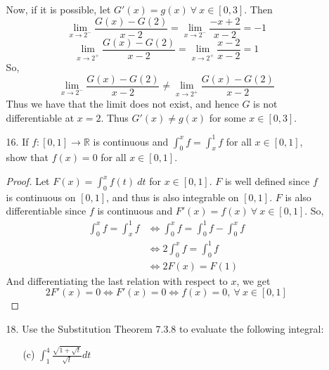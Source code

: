 \documentclass[12pt,letterpaper]{article}
\newcommand{\limx}[2]{\displaystyle\lim\limits_{#1 \to #2}}
\newcommand{\R}{\mathbb{R}}
\theoremstyle{case}
\theoremstyle{definition}
\begin{document}
\begin{enumerate}
\begin{enumerate}
			\\\\Now, if it is possible, let $G'(x)=g(x)\ \forall\ x \in [0,3]$. Then
			\[\limx{x}{2^-}\frac{G(x)-G(2)}{x-2}=\limx{x}{2^-}\frac{-x+2}{x-2} = -1\]
			\[\limx{x}{2^+}\frac{G(x)-G(2)}{x-2}=\limx{x}{2^+}\frac{x-2}{x-2}=1\]
			So,
			\[\limx{x}{2^-} \frac{G(x)-G(2)}{x-2}\neq \limx{x}{2^+}\frac{G(x)-G(2)}{x-2}\]
			Thus we have that the limit does not exist, and hence $G$ is not differentiable at $x=2$. Thus $G'(x) \neq g(x)$ for some $x \in [0,3]$.\\
			\item[16.] If $f:[0,1] \to \R$ is continuous and $\int_{0}^{x} f=\int_{x}^{1} f$ for all $x \in [0,1]$, show that $f(x)=0$ for all $x \in [0,1]$.
			\begin{proof}
				Let $F(x)=\displaystyle\int_{0}^{x} f(t)\ dt$ for $x \in [0,1]$. $F$ is well defined since $f$ is continuous on $[0,1]$, and thus is also integrable on $[0,1]$. $F$ is also differentiable since $f$ is continuous and $F'(x)=f(x)\ \forall\ x \in [0,1]$. So,
				\begin{align*}
					\int_{0}^{x} f = \int_{x}^{1} f &\Leftrightarrow \int_{0}^{x} f=\int_{0}^{1} f -\int_{0}^{x} f \\
					&\Leftrightarrow 2 \int_{0}^{x} f = \int_{0}^{1} f \\
					&\Leftrightarrow 2F(x)=F(1)
				\end{align*}
				And differentiating the last relation with respect to $x$, we get
				\[2F'(x)=0 \Leftrightarrow F'(x)=0 \Leftrightarrow f(x)=0,\ \forall\ x \in [0,1]\]
			\end{proof}
			\item[18.] Use the Substitution Theorem 7.3.8 to evaluate the following integral:
			\begin{enumerate}
				\item[(c)] $\int_{1}^{4} \frac{\sqrt{1+\sqrt{t}}}{\sqrt{t}} dt$

\end{enumerate}
\end{enumerate}
\end{enumerate}
\end{document}

